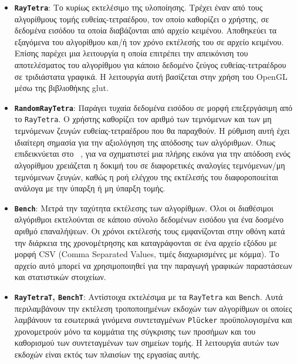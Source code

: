 \begin{itemize}

\item \textbf{\verb!RayTetra!}: Το κυρίως εκτελέσιμο της υλοποίησης. Τρέχει έναν από τους αλγορίθμους τομής ευθείας-τετραέδρου, τον οποίο καθορίζει ο χρήστης, σε δεδομένα εισόδου τα οποία διαβάζονται από αρχείο κειμένου. Αποθηκεύει τα εξαγόμενα του αλγορίθμου και/ή τον χρόνο εκτέλεσής του σε αρχείο κειμένου. Επίσης παρέχει μια λειτουργία η οποία επιτρέπει την απεικόνιση του αποτελέσματος του αλγορίθμου για κάποιο δεδομένο ζεύγος ευθείας-τετραέδρου σε τριδιάστατα γραφικά. Η λειτουργία αυτή βασίζεται στην χρήση του OpenGL μέσω της βιβλιοθήκης glut.

\item \textbf{\verb!RandomRayTetra!}: Παράγει τυχαία δεδομένα εισόδου σε μορφή επεξεργάσιμη από το \verb!RayTetra!. Ο χρήστης καθορίζει τον αριθμό των τεμνόμενων και των μη τεμνόμενων ζευγών ευθείας-τετραέδρου που θα παραχθούν. Η ρύθμιση αυτή έχει ιδιαίτερη σημασία για την αξιολόγηση της απόδοσης των αλγόριθμων. Όπως επιδεικνύεται στο ~\cite{PlatisTheoharis03}, για να σχηματιστεί μια πλήρης εικόνα για την απόδοση ενός αλγορίθμου χρειάζεται η δοκιμή του σε διαφορετικές αναλογίες τεμνόμενων/μη τεμνόμενων ζευγών, καθώς η ροή ελέγχου της εκτέλεσής του διαφοροποιείται ανάλογα με την ύπαρξη ή μη ύπαρξη τομής.

\item \textbf{\verb!Bench!}: Μετρά την ταχύτητα εκτέλεσης των αλγορίθμων. Όλοι οι διαθέσιμοι αλγόριθμοι εκτελούνται σε κάποιο σύνολο δεδομένων εισόδου για ένα δοσμένο αριθμό επαναλήψεων. Οι χρόνοι εκτέλεσής τους εμφανίζονται στην οθόνη κατά την διάρκεια της χρονομέτρησης και καταγράφονται σε ένα αρχείο εξόδου με μορφή CSV (Comma Separated Values, τιμές διαχωρισμένες με κόμμα). Το αρχείο αυτό μπορεί να χρησιμοποιηθεί για την παραγωγή γραφικών παραστάσεων και στατιστικών στοιχείων.

\item \textbf{\verb!RayTetraT!, \verb!BenchT!}: Αντίστοιχα εκτελέσιμα με τα \verb!RayTetra! και \verb!Bench!. Αυτά περιλαμβάνουν την εκτέλεση τροποποιημένων εκδοχών των αλγορίθμων οι οποίες λαμβάνουν τα εσωτερικά γινόμενα συντεταγμένων \verb!Plücker! προϋπολογισμένα και χρονομετρούν μόνο τα κομμάτια της σύγκρισης των προσήμων και του καθορισμού των συντεταγμένων των σημείων τομής. Η λειτουργία αυτών των εκδοχών είναι εκτός των πλαισίων της εργασίας αυτής.

\end{itemize}


